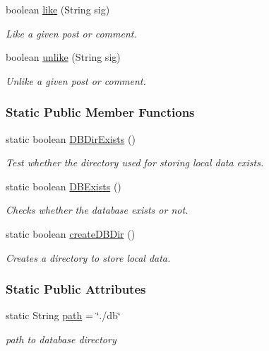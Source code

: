 \begin{DoxyCompactItemize}
boolean \hyperlink{classballmerpeak_1_1turtlenet_1_1server_1_1Database_ac2c2361722304a6446d5cd01cb0c5d3b}{like} (String sig)
\begin{DoxyCompactList}\small\item\em Like a given post or comment. \end{DoxyCompactList}\item 
boolean \hyperlink{classballmerpeak_1_1turtlenet_1_1server_1_1Database_a500911b2c3d32d456c2bf34a23747d85}{unlike} (String sig)
\begin{DoxyCompactList}\small\item\em Unlike a given post or comment. \end{DoxyCompactList}\end{DoxyCompactItemize}
\subsubsection*{Static Public Member Functions}
\begin{DoxyCompactItemize}
\item 
static boolean \hyperlink{classballmerpeak_1_1turtlenet_1_1server_1_1Database_a89fecb924cc735abbc16d58405945fb2}{D\-B\-Dir\-Exists} ()
\begin{DoxyCompactList}\small\item\em Test whether the directory used for storing local data exists. \end{DoxyCompactList}\item 
static boolean \hyperlink{classballmerpeak_1_1turtlenet_1_1server_1_1Database_a2001d0b63c21d13d0a023d70f571c5bd}{D\-B\-Exists} ()
\begin{DoxyCompactList}\small\item\em Checks whether the database exists or not. \end{DoxyCompactList}\item 
static boolean \hyperlink{classballmerpeak_1_1turtlenet_1_1server_1_1Database_aa21c9f4bf38697e84fe76fee2023be9e}{create\-D\-B\-Dir} ()
\begin{DoxyCompactList}\small\item\em Creates a directory to store local data. \end{DoxyCompactList}\end{DoxyCompactItemize}
\subsubsection*{Static Public Attributes}
\begin{DoxyCompactItemize}
\item 
\hypertarget{classballmerpeak_1_1turtlenet_1_1server_1_1Database_a3933689115f43166439d740b2a254481}{static String \hyperlink{classballmerpeak_1_1turtlenet_1_1server_1_1Database_a3933689115f43166439d740b2a254481}{path} = \char`\"{}./db\char`\"{}}\label{classballmerpeak_1_1turtlenet_1_1server_1_1Database_a3933689115f43166439d740b2a254481}

\begin{DoxyCompactList}\small\item\em path to database directory \end{DoxyCompactList}\end{DoxyCompactItemize}
